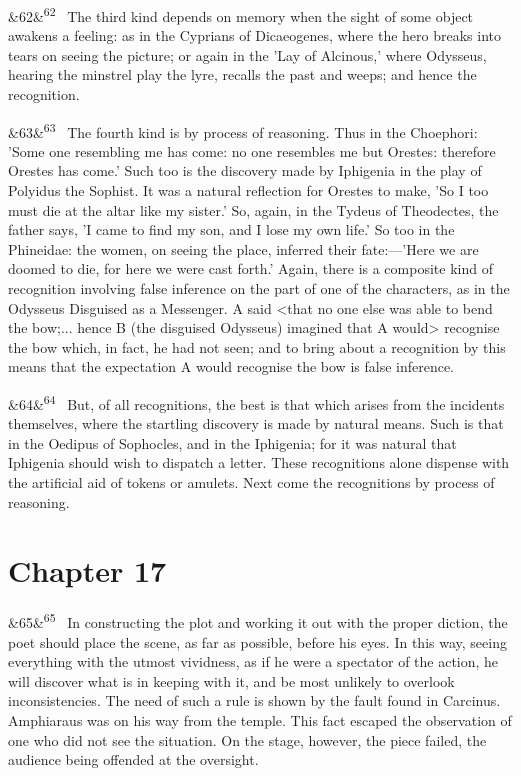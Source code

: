 \documentclass[12pt]{article}
\newcommand{\para}[1][]{\par\noindent\ifx&#1&\else\textsuperscript{\footnotesize #1}~\fi}
\begin{document}
\para[62] The third kind depends on memory when the sight of some object awakens a feeling: as in the Cyprians of Dicaeogenes, where the hero breaks into tears on seeing the picture; or again in the 'Lay of Alcinous,' where Odysseus, hearing the minstrel play the lyre, recalls the past and weeps; and hence the recognition.

\para[63] The fourth kind is by process of reasoning. Thus in the Choephori: 'Some one resembling me has come: no one resembles me but Orestes: therefore Orestes has come.' Such too is the discovery made by Iphigenia in the play of Polyidus the Sophist. It was a natural reflection for Orestes to make, 'So I too must die at the altar like my sister.' So, again, in the Tydeus of Theodectes, the father says, 'I came to find my son, and I lose my own life.' So too in the Phineidae: the women, on seeing the place, inferred their fate:---'Here we are doomed to die, for here we were cast forth.' Again, there is a composite kind of recognition involving false inference on the part of one of the characters, as in the Odysseus Disguised as a Messenger. A said <that no one else was able to bend the bow;... hence B (the disguised Odysseus) imagined that A would> recognise the bow which, in fact, he had not seen; and to bring about a recognition by this means that the expectation A would recognise the bow is false inference.

\para[64] But, of all recognitions, the best is that which arises from the incidents themselves, where the startling discovery is made by natural means. Such is that in the Oedipus of Sophocles, and in the Iphigenia; for it was natural that Iphigenia should wish to dispatch a letter. These recognitions alone dispense with the artificial aid of tokens or amulets. Next come the recognitions by process of reasoning.

\section*{Chapter 17}

\para[65] In constructing the plot and working it out with the proper diction, the poet should place the scene, as far as possible, before his eyes. In this way, seeing everything with the utmost vividness, as if he were a spectator of the action, he will discover what is in keeping with it, and be most unlikely to overlook inconsistencies. The need of such a rule is shown by the fault found in Carcinus. Amphiaraus was on his way from the temple. This fact escaped the observation of one who did not see the situation. On the stage, however, the piece failed, the audience being offended at the oversight.
\end{document}
